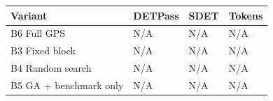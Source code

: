 \begin{tabular}{llll}
\toprule
Variant & DETPass & SDET & Tokens \\
\midrule
B6 Full GPS & N/A & N/A & N/A \\
B3 Fixed block & N/A & N/A & N/A \\
B4 Random search & N/A & N/A & N/A \\
B5 GA + benchmark only & N/A & N/A & N/A \\
\bottomrule
\end{tabular}
